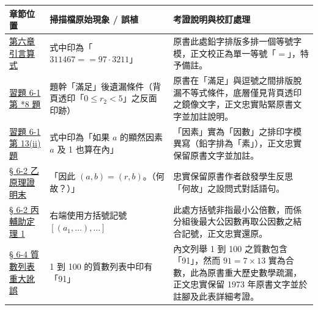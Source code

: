 \documentclass[a4paper,12pt,twoside]{article}
\begin{document}
\begin{table}[H]
\centering
\small
\renewcommand{\arraystretch}{1.35}
\begin{tabularx}{\textwidth}{|p{3.2cm}|p{3.8cm}|X|}
\hline
\textbf{章節位置} & \textbf{掃描檔原始現象 / 誤植} & \textbf{考證說明與校訂處理} \\ \hline

\hyperref[note:ch6-double-equal]{第六章 引言算式} & 
式中印為「$311467==97 \cdot 3211$」 & 
原書此處鉛字排版多排一個等號字模，正文校正為單一等號「$=$」，特予備註。 \\ \hline

\hyperref[item:ex6-1-8]{習題 6-1 第 *8 題} & 
題幹「滿足」後遺漏條件（背頁透印「$0 \le r_2 < 5$」之反面印跡） & 
原書在「滿足」與逗號之間排版脫漏不等式條件，底層僅見背頁透印之鏡像文字，正文忠實貼緊原書文字並加註說明。 \\ \hline

\hyperref[item:ex6-1-13-2]{習題 6-1 第 13(ii) 題} & 
式中印為「如果 $a$ 的顯然因素 $a$ 及 1 也算在內」 & 
「因素」實為「因數」之排印字模異寫（鉛字排為「素」），正文忠實保留原書文字並加註。 \\ \hline

\hyperref[note:ch6-why-euclid]{§ 6-2 乙 原理證明末} & 
「因此 $(a, b) = (r, b)$。（何故？）」 & 
忠實保留原書作者啟發學生反思「何故」之設問式對話語句。 \\ \hline

\hyperref[note:ch6-gcd-bracket]{§ 6-2 丙 輔助定理 1} & 
右端使用方括號記號 $[(a_1, \dots), \dots]$ & 
此處方括號非指最小公倍數，而係分組後最大公因數再取公因數之結合記號，正文忠實還原。 \\ \hline

\hyperref[note:ch6-prime91]{§ 6-4 質數列表重大訛誤} & 
1 到 100 的質數列表中印有「91」 & 
內文列舉 1 到 100 之質數包含「91」，然而 $91 = 7 \times 13$ 實為合數，此為原書重大歷史數學疏漏，正文忠實保留 1973 年原書文字並於註腳及此表詳細考證。 \\ \hline

\end{tabularx}
\end{table}

\clearpage
\tableofcontents
\newpage


\end{document}
